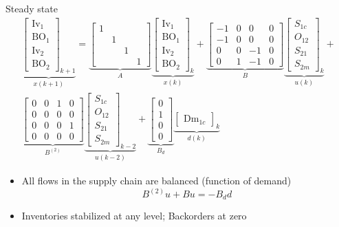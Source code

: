 \documentclass[table]{beamer}
\newcommand{\BO}{\textrm{BO}}
\newcommand{\Inv}{\textrm{Iv}}
\newcommand{\Dem}{\textrm{Dm}}
\begin{document}
\begin{frame}{Steady state}
{\tiny{
\begin{multline*}
\underbrace{\begin{bmatrix}\Inv_1\\\BO_1\\\Inv_2 \\
    \BO_2\end{bmatrix}_{k+1}}_{x(k+1)} = 
\underbrace{\begin{bmatrix} 1 & & &
 \\ & 1 & &\\ & & 1 & \\ & & & 1\end{bmatrix}}_{A}
\underbrace{\begin{bmatrix}\Inv_1\\\BO_1\\\Inv_2 \\
    \BO_2\end{bmatrix}_{k}}_{x(k)}+
\underbrace{\begin{bmatrix}-1&0 &0 &0 \\-1&0 &0 &0 \\
0&0 & -1 &0 \\0 & 1 & -1 &0 \end{bmatrix}}_{B}
\underbrace{\begin{bmatrix}S_{1c}\\O_{12}\\S_{21}\\S_{2m}\end{bmatrix}_{k}}_{u(k)}+\\
\underbrace{\begin{bmatrix} 0&0 &1 &0 \\0 &0 &0 &0 \\
0&0 &0  &1 \\0 & 0 &0  &0 \end{bmatrix}}_{B^{(2)}} 
\underbrace{\begin{bmatrix}S_{1c}\\O_{12}\\S_{21}\\S_{2m}\end{bmatrix}_{k-2}}_{u(k-2)}+
\underbrace{\begin{bmatrix}0 \\ 1 \\0 \\0 \end{bmatrix}}_{B_d}\underbrace{\begin{bmatrix}\Dem_{1c}\end{bmatrix}_{k}}_{d(k)}
\end{multline*}}}
\begin{itemize}
\item  All flows in the supply chain are balanced (function of demand)
\[ B^{(2)}u + Bu = -B_dd\]
\item Inventories stabilized at any level; Backorders at zero
\end{itemize}
\end{frame}
\end{document}
